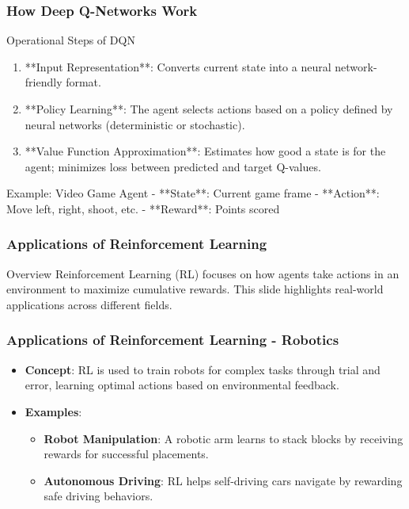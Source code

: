 \documentclass[aspectratio=169]{beamer}
\begin{document}
\begin{frame}[fragile]
    \frametitle{How Deep Q-Networks Work}
    \begin{block}{Operational Steps of DQN}
        \begin{enumerate}
            \item **Input Representation**: Converts current state into a neural network-friendly format.
            \item **Policy Learning**: The agent selects actions based on a policy defined by neural networks (deterministic or stochastic).
            \item **Value Function Approximation**: Estimates how good a state is for the agent; minimizes loss between predicted and target Q-values.
        \end{enumerate}
    \end{block}
    
    \begin{block}{Example: Video Game Agent}
        - **State**: Current game frame
        - **Action**: Move left, right, shoot, etc.
        - **Reward**: Points scored
    \end{block}
\end{frame}

\begin{frame}[fragile]
    \frametitle{Applications of Reinforcement Learning}
    
    \begin{block}{Overview}
        Reinforcement Learning (RL) focuses on how agents take actions in an environment to maximize cumulative rewards. This slide highlights real-world applications across different fields.
    \end{block}
\end{frame}

\begin{frame}[fragile]
    \frametitle{Applications of Reinforcement Learning - Robotics}
    
    \begin{itemize}
        \item \textbf{Concept}: RL is used to train robots for complex tasks through trial and error, learning optimal actions based on environmental feedback.
        
        \item \textbf{Examples}:
        \begin{itemize}
            \item \textbf{Robot Manipulation}: A robotic arm learns to stack blocks by receiving rewards for successful placements.
            \item \textbf{Autonomous Driving}: RL helps self-driving cars navigate by rewarding safe driving behaviors.
        \end{itemize}
    \end{itemize}
\end{frame}
\end{document}
